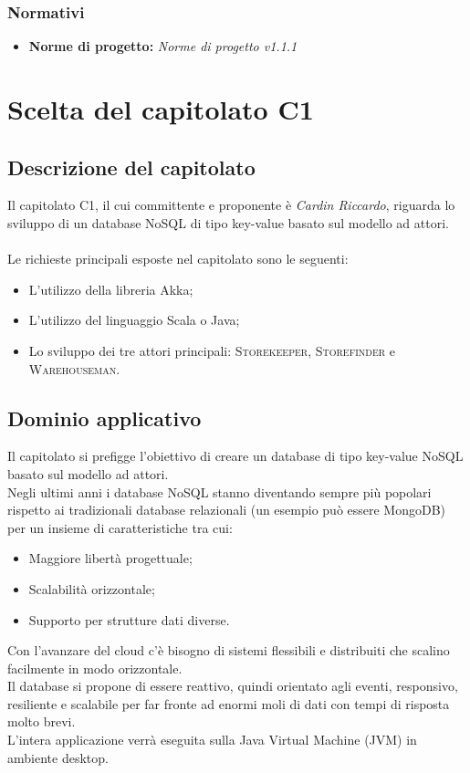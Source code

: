 \documentclass[a4paper]{article}
\begin{document}
	\subsubsection{Normativi}
		\begin{itemize}
			\item \textbf{Norme di progetto:} \emph{Norme di progetto v1.1.1}
		\end{itemize}

	\newpage	
	\section{Scelta del capitolato C1}
		\subsection{Descrizione del capitolato}
			Il capitolato C1, il cui committente e proponente è \emph{Cardin Riccardo}, riguarda lo sviluppo 
			di un database NoSQL di tipo key-value basato sul modello ad attori.
			\\ \\
			Le richieste principali esposte nel capitolato sono le seguenti:
			\begin{itemize}
				\item L'utilizzo della libreria Akka;
				\item L'utilizzo del linguaggio Scala o Java;
				\item Lo sviluppo dei tre attori principali: \textsc{Storekeeper},
				 \textsc{Storefinder} e \textsc{Warehouseman}.
			\end{itemize}
		\subsection{Dominio applicativo}
			Il capitolato si prefigge l'obiettivo di creare un database di tipo key-value NoSQL basato sul
			modello ad attori. \\
			Negli ultimi anni i database NoSQL stanno diventando sempre più popolari  rispetto ai tradizionali
			database relazionali (un esempio può essere MongoDB) per un insieme di caratteristiche tra cui: 
			\begin{itemize}
				\item Maggiore libertà progettuale;
				\item Scalabilità orizzontale;
				\item Supporto per strutture dati diverse.
			\end{itemize}
			Con l'avanzare del cloud c'è bisogno di sistemi flessibili e distribuiti che scalino facilmente in modo
			orizzontale. \\
			Il database si propone di essere reattivo, quindi orientato agli eventi, responsivo, resiliente e
			scalabile per far fronte ad enormi moli di dati con tempi di risposta molto brevi. \\
			L'intera applicazione verrà eseguita sulla Java Virtual Machine (JVM) in ambiente
			 desktop.
\end{document}
